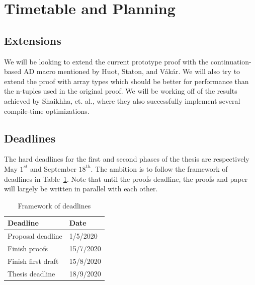 \documentclass[11pt, final]{article}
\def\Vakar{V\'{a}k\'{a}r}
\begin{document}
\section{Timetable and Planning}

\subsection{Extensions}

We will be looking to extend the current prototype proof with the continuation-based AD macro mentioned by Huot, Staton, and \Vakar{}\cite{huot2020correctness}.
We will also try to extend the proof with array types which should be better for performance than the n-tuples used in the original proof.
We will be working off of the results achieved by Shaikhha, et. al.\cite{Shaikha2019}, where they also successfully implement several compile-time optimizations. %


\subsection{Deadlines}

The hard deadlines for the first and second phases of the thesis are respectively May $1^{st}$ and September $18^{th}$. The ambition is to follow the framework of deadlines in Table~\ref{tbl:deadlines}. Note that until the proofs deadline, the proofs and paper will largely be written in parallel with each other.

\begin{table}
  \begin{center}
    \begin{tabular}{ | m{5cm} | m{5cm} | }
      \hline
      Deadline          & Date  \\
      \hline
      Proposal deadline & 1/5/2020 \\
      Finish proofs & 15/7/2020 \\
      Finish first draft & 15/8/2020 \\
      Thesis deadline & 18/9/2020 \\
      \hline
    \end{tabular}
  \end{center}
  \caption{Framework of deadlines}
  \label{tbl:deadlines}
\end{table}

\printbibliography
\makeatother
\end{document}
